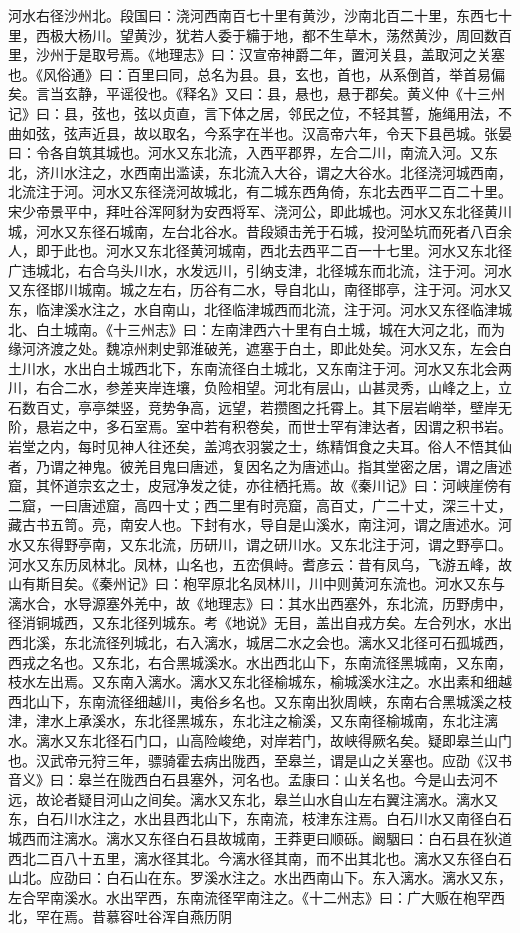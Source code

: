 \documentclass[12pt,UTF8]{ctexbook}
\begin{document}
河水右径沙州北。段国曰：浇河西南百七十里有黄沙，沙南北百二十里，东西七十里，西极大杨川。望黄沙，犹若人委于糒于地，都不生草木，荡然黄沙，周回数百里，沙州于是取号焉。《地理志》曰：汉宣帝神爵二年，置河关县，盖取河之关塞也。《风俗通》曰：百里曰同，总名为县。县，玄也，首也，从系倒首，举首易偏矣。言当玄静，平谣役也。《释名》又曰：县，悬也，悬于郡矣。黄义仲《十三州记》曰：县，弦也，弦以贞直，言下体之居，邻民之位，不轻其誓，施绳用法，不曲如弦，弦声近县，故以取名，今系字在半也。汉高帝六年，令天下县邑城。张晏曰：令各自筑其城也。河水又东北流，入西平郡界，左合二川，南流入河。又东北，济川水注之，水西南出滥读，东北流入大谷，谓之大谷水。北径浇河城西南，北流注于河。河水又东径浇河故城北，有二城东西角倚，东北去西平二百二十里。宋少帝景平中，拜吐谷浑阿豺为安西将军、浇河公，即此城也。河水又东北径黄川城，河水又东径石城南，左台北谷水。昔段熲击羌于石城，投河坠坑而死者八百余人，即于此也。河水又东北径黄河城南，西北去西平二百一十七里。河水又东北径广违城北，右合乌头川水，水发远川，引纳支津，北径城东而北流，注于河。河水又东径邯川城南。城之左右，历谷有二水，导自北山，南径邯亭，注于河。河水又东，临津溪水注之，水自南山，北径临津城西而北流，注于河。河水又东径临津城北、白土城南。《十三州志》曰：左南津西六十里有白土城，城在大河之北，而为缘河济渡之处。魏凉州刺史郭淮破羌，遮塞于白土，即此处矣。河水又东，左会白土川水，水出白土城西北下，东南流径白土城北，又东南注于河。河水又东北会两川，右合二水，参差夹岸连壤，负险相望。河北有层山，山甚灵秀，山峰之上，立石数百丈，亭亭桀竖，竞势争高，远望，若攒图之托霄上。其下层岩峭举，壁岸无阶，悬岩之中，多石室焉。室中若有积卷矣，而世士罕有津达者，因谓之积书岩。岩堂之内，每时见神人往还矣，盖鸿衣羽裳之士，练精饵食之夫耳。俗人不悟其仙者，乃谓之神鬼。彼羌目鬼曰唐述，复因名之为唐述山。指其堂密之居，谓之唐述窟，其怀道宗玄之士，皮冠净发之徒，亦往栖托焉。故《秦川记》曰：河峡崖傍有二窟，一曰唐述窟，高四十丈；西二里有时亮窟，高百丈，广二十丈，深三十丈，藏古书五笥。亮，南安人也。下封有水，导自是山溪水，南注河，谓之唐述水。河水又东得野亭南，又东北流，历研川，谓之研川水。又东北注于河，谓之野亭口。河水又东历凤林北。凤林，山名也，五峦俱峙。耆彦云：昔有凤乌，飞游五峰，故山有斯目矣。《秦州记》曰：枹罕原北名凤林川，川中则黄河东流也。河水又东与漓水合，水导源塞外羌中，故《地理志》曰：其水出西塞外，东北流，历野虏中，径消铜城西，又东北径列城东。考《地说》无目，盖出自戎方矣。左合列水，水出西北溪，东北流径列城北，右入漓水，城居二水之会也。漓水又北径可石孤城西，西戎之名也。又东北，右合黑城溪水。水出西北山下，东南流径黑城南，又东南，枝水左出焉。又东南入漓水。漓水又东北径榆城东，榆城溪水注之。水出素和细越西北山下，东南流径细越川，夷俗乡名也。又东南出狄周峡，东南右合黑城溪之枝津，津水上承溪水，东北径黑城东，东北注之榆溪，又东南径榆城南，东北注漓水。漓水又东北径石门口，山高险峻绝，对岸若门，故峡得厥名矣。疑即皋兰山门也。汉武帝元狩三年，骠骑霍去病出陇西，至皋兰，谓是山之关塞也。应劭《汉书音义》曰：皋兰在陇西白石县塞外，河名也。孟康曰：山关名也。今是山去河不远，故论者疑目河山之间矣。漓水又东北，皋兰山水自山左右翼注漓水。漓水又东，白石川水注之，水出县西北山下，东南流，枝津东注焉。白石川水又南径白石城西而注漓水。漓水又东径白石县故城南，王莽更曰顺砾。阚駰曰：白石县在狄道西北二百八十五里，漓水径其北。今漓水径其南，而不出其北也。漓水又东径白石山北。应劭曰：白石山在东。罗溪水注之。水出西南山下。东入漓水。漓水又东，左合罕南溪水。水出罕西，东南流径罕南注之。《十二州志》曰：广大贩在枹罕西北，罕在焉。昔慕容吐谷浑自燕历阴
\end{document}
